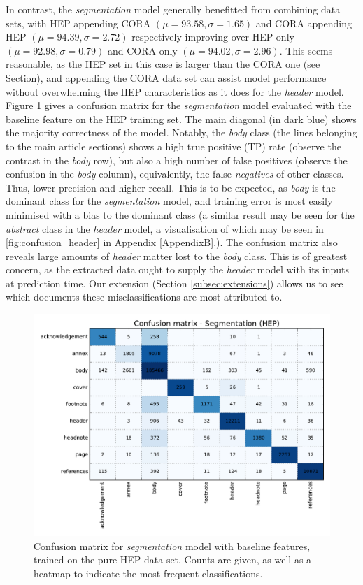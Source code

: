 In contrast, the \emph{segmentation} model generally benefitted from combining data sets, with HEP appending CORA $(\mu = 93.58, \sigma = 1.65)$ and CORA appending HEP $(\mu = 94.39, \sigma = 2.72)$ respectively improving over HEP only $(\mu = 92.98, \sigma = 0.79)$ and CORA only $(\mu = 94.02, \sigma = 2.96)$. This seems reasonable, as the HEP set in this case is larger than the CORA one (see Section), and appending the CORA data set can assist model performance without overwhelming the HEP characteristics as it does for the \emph{header} model. Figure \ref{fig:segmentation_baseline_confusion} gives a confusion matrix for the \emph{segmentation} model evaluated with the baseline feature on the HEP training set. The main diagonal (in dark blue) shows the majority correctness of the model. Notably, the \emph{body} class (the lines belonging to the main article sections) shows a high true positive (TP) rate (observe the contrast in the \emph{body} row), but also a high number of false positives (observe the confusion in the \emph{body} column), equivalently, the false \emph{negatives} of other classes. Thus, lower precision and higher recall. This is to be expected, as \emph{body} is the dominant class for the \emph{segmentation} model, and training error is most easily minimised with a bias to the dominant class (a similar result may be seen for the \emph{abstract} class in the \emph{header} model, a visualisation of which may be seen in \ref{fig:confusion_header} in Appendix \ref{AppendixB}.). The confusion matrix also reveals large amounts of \emph{header} matter lost to the \emph{body} class. This is of greatest concern, as the extracted data ought to supply the \emph{header} model with its inputs at prediction time. Our extension (Section \ref{subsec:extensions}) allows us to see which documents these misclassifications are most attributed to.

\begin{figure}[h]
\center
\includegraphics[width=5.5in]{Figures/baseline_confusion_segmentation.pdf}
\caption{Confusion matrix for \emph{segmentation} model with baseline features, trained on the pure HEP data set. Counts are given, as well as a heatmap to indicate the most frequent classifications.}
\label{fig:segmentation_baseline_confusion}
\end{figure}

